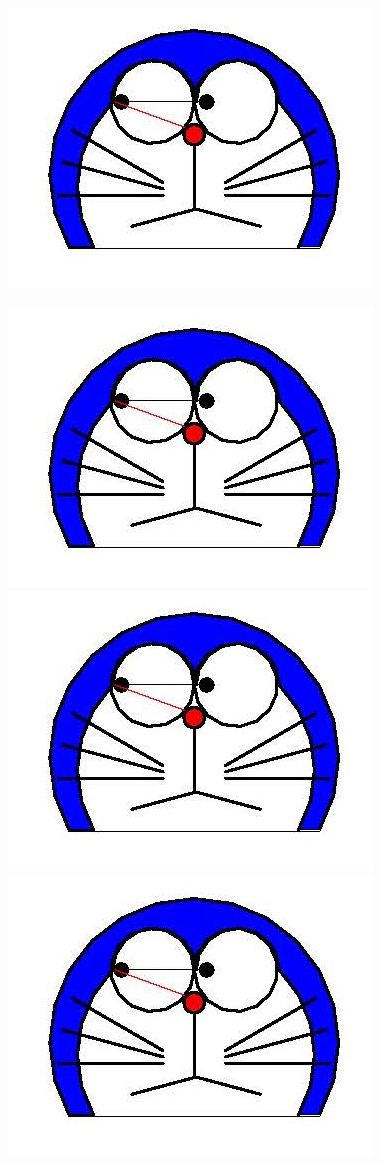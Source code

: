 \documentclass{article}
\begin{document}
\includegraphics{doraemon1.jpg}


\includegraphics[scale=.3]{doraemon1.jpg}
\includegraphics[scale=.5]{doraemon1.jpg}
\includegraphics[scale=.7]{doraemon1.jpg}
\end{document}
